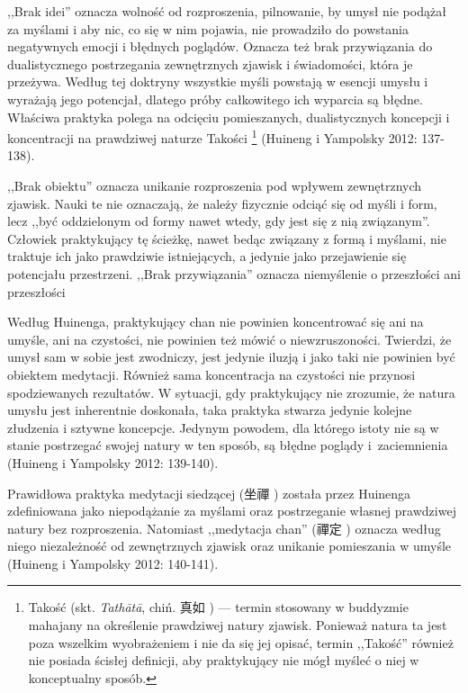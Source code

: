 ,,Brak idei'' oznacza wolność od rozproszenia, pilnowanie, by umysł nie podążał za myślami i aby nic, co się w nim pojawia, nie prowadziło do powstania negatywnych emocji i błędnych poglądów.
Oznacza też brak przywiązania do dualistycznego postrzegania zewnętrznych zjawisk i świadomości, która je przeżywa.
Według tej doktryny wszystkie myśli powstają w esencji umysłu i wyrażają jego potencjał, dlatego próby całkowitego ich wyparcia są błędne.
Właściwa praktyka polega na odcięciu pomieszanych, dualistycznych koncepcji i koncentracji na prawdziwej naturze Takości%
\footnote{Takość (skt. \textit{Tathātā}, chiń. 真如 ) --- termin stosowany w buddyzmie mahajany na określenie prawdziwej natury zjawisk. Ponieważ natura ta jest poza wszelkim wyobrażeniem i nie da się jej opisać,  termin ,,Takość'' również nie posiada ścisłej definicji, aby praktykujący nie mógł myśleć o niej w konceptualny sposób.}
(Huineng i Yampolsky 2012: 137-138).

,,Brak obiektu'' oznacza unikanie rozproszenia pod wpływem zewnętrznych zjawisk. Nauki te nie oznaczają, że należy fizycznie odciąć się od myśli i form, lecz ,,być oddzielonym od formy nawet wtedy, gdy jest się z nią związanym''. Człowiek praktykujący tę ścieżkę, nawet bedąc związany z formą i myślami, nie traktuje ich jako prawdziwie istniejących, a jedynie jako przejawienie się potencjału przestrzeni. ,,Brak przywiązania'' oznacza niemyślenie o przeszłości ani przeszłości\ibid

Według Huinenga, praktykujący chan nie powinien koncentrować się ani na umyśle, ani na czystości, nie powinien też mówić o niewzruszoności. Twierdzi, że umysł sam w sobie jest zwodniczy, jest jedynie iluzją i jako taki nie powinien być obiektem medytacji. Również sama koncentracja na czystości nie przynosi spodziewanych rezultatów. W sytuacji, gdy praktykujący nie zrozumie, że natura umysłu jest inherentnie doskonała, taka praktyka stwarza jedynie kolejne złudzenia i sztywne koncepcje. Jedynym powodem, dla którego istoty nie są w stanie postrzegać swojej natury w ten sposób, są błędne poglądy i~zaciemnienia (Huineng i Yampolsky 2012: 139-140).

Prawidłowa praktyka medytacji siedzącej (坐禪 ) została przez Huinenga zdefiniowana jako niepodążanie za myślami oraz postrzeganie własnej prawdziwej natury bez rozproszenia. Natomiast ,,medytacja chan'' (禪定 ) oznacza według niego niezależność od zewnętrznych zjawisk oraz unikanie pomieszania w umyśle (Huineng i Yampolsky 2012: 140-141).

